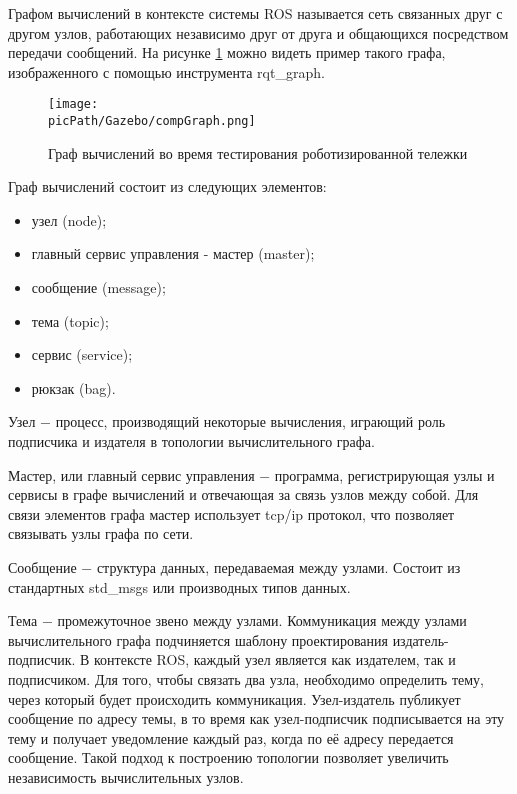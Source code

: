 \documentclass[oneside,final,14pt]{extreport}
\newcommand{\picPath}{img}
\newcommand{\indentSpace}{1.25cm}
\begin{document}
Графом вычислений в контексте системы ROS называется сеть связанных друг с другом узлов, работающих независимо друг от друга и общающихся посредством передачи сообщений. 
На рисунке \ref{Figure:gazeboGraph} можно видеть пример такого графа, изображенного с помощью инструмента rqt_graph.


\begin{figure}[H]
\begin{center}
\texttt{[image: \\picPath/Gazebo/compGraph.png]}
\end{center}
  \caption{ Граф вычислений во время тестирования роботизированной тележки }
  \label{Figure:gazeboGraph}
\end{figure}


Граф вычислений состоит из следующих элементов:

\begin{itemize}
\item узел (node);
\setlength{\itemindent}{-\indentSpace }
\item главный сервис управления - мастер (master);
\item сообщение (message);
\item тема (topic);
\item сервис (service);
\item рюкзак (bag).
\end{itemize}

Узел $-$  процесс, производящий некоторые вычисления, играющий роль подписчика и издателя в топологии вычислительного графа. 

Мастер, или главный сервис управления $-$ программа, регистрирующая узлы и сервисы в графе вычислений и отвечающая за связь узлов между собой. Для связи элементов графа мастер использует tcp/ip протокол, что позволяет связывать узлы графа по сети.   

Сообщение $-$ структура данных, передаваемая между узлами. Состоит из стандартных std_msgs или производных типов данных.

Тема $-$  промежуточное звено между узлами. Коммуникация между узлами вычислительного графа подчиняется шаблону проектирования издатель-подписчик. В контексте ROS, каждый узел является как издателем, так и подписчиком. Для того, чтобы связать два узла, необходимо определить тему, через который будет происходить коммуникация. Узел-издатель публикует сообщение по адресу темы, в то время как узел-подписчик подписывается на эту тему и получает уведомление каждый раз, когда по её адресу передается сообщение. Такой подход к построению топологии позволяет увеличить независимость вычислительных узлов.
\end{document}
